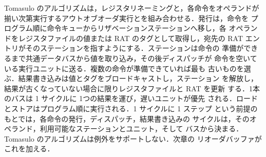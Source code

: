 \documentclass[../main.tex]{subfiles}
\begin{document}
\begin{keypoint}[章のまとめ]
  Tomasulo のアルゴリズムは，レジスタリネーミングと，各命令をオペランドが
  揃い次第実行するアウトオブオーダ実行とを組み合わせる．発行は，命令を
  プログラム順に命令キューからリザベーションステーションへ移し，各
  オペランドをレジスタファイルの値または RAT のタグとして取得し，宛先の
  RAT エントリがそのステーションを指すようにする．ステーションは命令の
  準備ができるまで共通データバスから値を取り込み，その後ディスパッチが
  命令を空いている実行ユニットに送る．複数の命令が準備できていれば最も
  古いものを選ぶ．結果書き込みは値とタグをブロードキャストし，ステーション
  を解放し，結果が古くなっていない場合に限りレジスタファイルと RAT を更新
  する．1本のバスは 1 サイクルに 1つの結果を運び，遅いユニットが優先
  される．ロードとストアはプログラム順に実行される．1 サイクルに 1 ステップ
  という前提のもとでは，各命令の発行，ディスパッチ，結果書き込みの
  サイクルは，そのオペランド，利用可能なステーションとユニット，そして
  バスから決まる．Tomasulo のアルゴリズムは例外をサポートしない．次章の
  リオーダバッファがこれを加える．
\end{keypoint}
\end{document}
